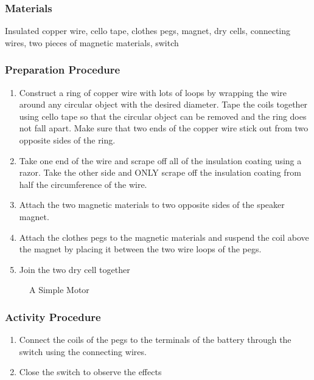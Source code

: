 \subsubsection*{Materials}
Insulated copper wire, cello tape, clothes pegs, magnet, dry cells, connecting wires, two pieces of magnetic materials, switch

\subsubsection*{Preparation Procedure}
\begin{enumerate}
\item{Construct a ring of copper wire with lots of loops by wrapping the wire around any circular object with the desired diameter. Tape the coils together using cello tape so that the circular object can be removed and the ring does not fall apart. Make sure that two ends of the copper wire stick out from two opposite sides of the ring.} 
\item{ Take one end of the wire and scrape off all of the insulation coating using a razor. Take the other side and ONLY scrape off the insulation coating from half the circumference of the wire.} 
\item{Attach the two magnetic materials to two opposite sides of the speaker magnet.} 
\item{Attach the clothes pegs to the magnetic materials and suspend the coil above the magnet by placing it between the two wire loops of the pegs.} 
\item{Join the two dry cell together}
\end{enumerate}

\begin{figure}[h]
\begin{center}
\def\svgwidth{300pt}

\caption{A Simple Motor}
\label{fig:simple-motor}
\end{center}
\end{figure}

\subsubsection*{Activity Procedure}
\begin{enumerate}
\item{Connect the coils of the pegs to the terminals of the battery through the switch using the connecting wires.} 
\item{Close the switch to observe the effects}
\end{enumerate}

